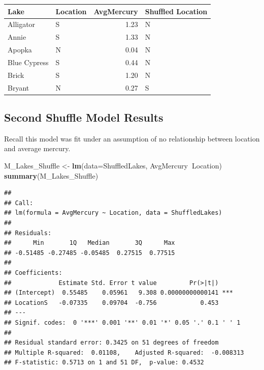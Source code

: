 \documentclass[]{book}
\newenvironment{Shaded}{\begin{snugshade}}{\end{snugshade}}
\newcommand{\KeywordTok}[1]{\textcolor[rgb]{0.13,0.29,0.53}{\textbf{#1}}}
\newcommand{\DataTypeTok}[1]{\textcolor[rgb]{0.13,0.29,0.53}{#1}}
\newcommand{\DecValTok}[1]{\textcolor[rgb]{0.00,0.00,0.81}{#1}}
\newcommand{\StringTok}[1]{\textcolor[rgb]{0.31,0.60,0.02}{#1}}
\newcommand{\OperatorTok}[1]{\textcolor[rgb]{0.81,0.36,0.00}{\textbf{#1}}}
\newcommand{\NormalTok}[1]{#1}
\begin{document}
\begin{Shaded}
\end{Shaded}

\begin{tabular}{l|l|r|l}
\hline
Lake & Location & AvgMercury & Shuffled Location\\
\hline
Alligator & S & 1.23 & N\\
\hline
Annie & S & 1.33 & N\\
\hline
Apopka & N & 0.04 & N\\
\hline
Blue Cypress & S & 0.44 & N\\
\hline
Brick & S & 1.20 & N\\
\hline
Bryant & N & 0.27 & S\\
\hline
\end{tabular}

\subsection{Second Shuffle Model
Results}\label{second-shuffle-model-results}

Recall this model was fit under an assumption of no relationship between
location and average mercury.

\begin{Shaded}
\begin{Highlighting}[]
\NormalTok{M_Lakes_Shuffle <-}\StringTok{ }\KeywordTok{lm}\NormalTok{(}\DataTypeTok{data=}\NormalTok{ShuffledLakes, AvgMercury}\OperatorTok{~}\NormalTok{Location)}
\KeywordTok{summary}\NormalTok{(M_Lakes_Shuffle)}
\end{Highlighting}
\end{Shaded}

\begin{verbatim}
## 
## Call:
## lm(formula = AvgMercury ~ Location, data = ShuffledLakes)
## 
## Residuals:
##      Min       1Q   Median       3Q      Max 
## -0.51485 -0.27485 -0.05485  0.27515  0.77515 
## 
## Coefficients:
##             Estimate Std. Error t value         Pr(>|t|)    
## (Intercept)  0.55485    0.05961   9.308 0.00000000000141 ***
## LocationS   -0.07335    0.09704  -0.756            0.453    
## ---
## Signif. codes:  0 '***' 0.001 '**' 0.01 '*' 0.05 '.' 0.1 ' ' 1
## 
## Residual standard error: 0.3425 on 51 degrees of freedom
## Multiple R-squared:  0.01108,    Adjusted R-squared:  -0.008313 
## F-statistic: 0.5713 on 1 and 51 DF,  p-value: 0.4532
\end{verbatim}
\end{document}
